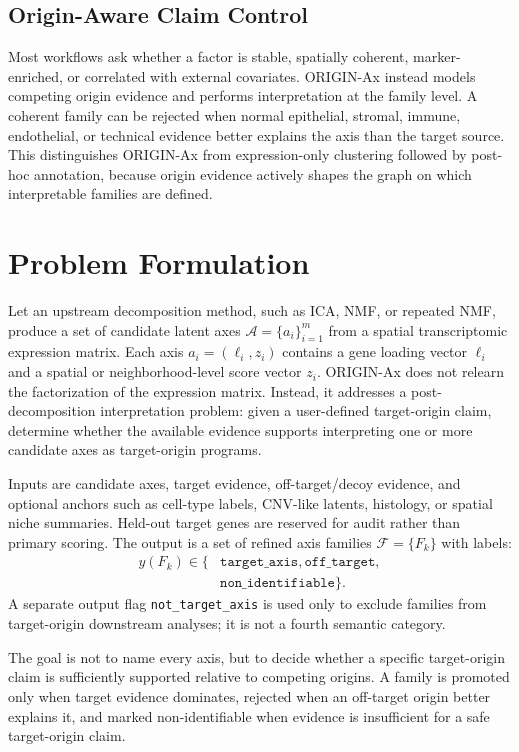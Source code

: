 \documentclass[conference]{IEEEtran}
\begin{document}
\subsection{Origin-Aware Claim Control}

Most workflows ask whether a factor is stable, spatially coherent,
marker-enriched, or correlated with external covariates. ORIGIN-Ax instead
models competing origin evidence and performs interpretation at the family
level. A coherent family can be rejected when normal epithelial, stromal,
immune, endothelial, or technical evidence better explains the axis than the
target source. This distinguishes ORIGIN-Ax from expression-only clustering
followed by post-hoc annotation, because origin evidence actively shapes the
graph on which interpretable families are defined.

\section{Problem Formulation}

Let an upstream decomposition method, such as ICA, NMF, or
repeated NMF, produce a set of candidate latent axes
$\mathcal{A}=\{a_i\}_{i=1}^{m}$ from a spatial transcriptomic
expression matrix. Each axis $a_i=(\ell_i,z_i)$ contains a gene
loading vector $\ell_i$ and a spatial or neighborhood-level score
vector $z_i$. ORIGIN-Ax does not relearn the factorization of the
expression matrix. Instead, it addresses a post-decomposition
interpretation problem: given a user-defined target-origin claim,
determine whether the available evidence supports interpreting
one or more candidate axes as target-origin programs.

Inputs are candidate axes, target evidence, off-target/decoy evidence, and
optional anchors such as cell-type labels, CNV-like latents, histology, or
spatial niche summaries. Held-out target genes are reserved for audit rather
than primary scoring. The output is a set of refined axis families
$\mathcal{F}=\{F_k\}$ with labels:
\[
\begin{aligned}
y(F_k)\in\{&
\texttt{target\_axis},\texttt{off\_target},\\
&\texttt{non\_identifiable}\}.
\end{aligned}
\]
A separate output flag \texttt{not\_target\_axis} is used only to exclude
families from target-origin downstream analyses; it is not a fourth semantic
category.

The goal is not to name every axis, but to decide whether a specific
target-origin claim is sufficiently supported relative to competing origins. A
family is promoted only when target evidence dominates, rejected when an
off-target origin better explains it, and marked non-identifiable when evidence
is insufficient for a safe target-origin claim.
\end{document}
